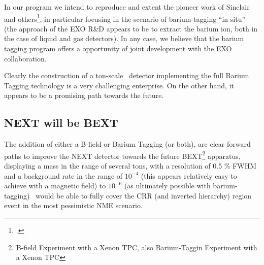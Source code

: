 In our program we intend to reproduce and extent the pioneer work of Sinclair and others\footcite{Sinclair:2011zz}, in particular focusing in the scenario of barium-tagging ``in situ'' (the approach of the EXO R\&D appears to be to extract the barium ion, both in the case of liquid and gas detectors). In any case, we believe that the barium tagging program offers a opportunity of joint development with the EXO collaboration.

Clearly the construction of a ton-scale \HPXE\ detector implementing the full Barium Tagging technology is a very challenging enterprise. On the other hand, it appears to be a promising path towards the future. 


  
\subsection{NEXT will be BEXT}
The addition of either a B-field or Barium Tagging (or both), are clear forward paths to improve the NEXT detector towards the future BEXT\footnote{B-field Experiment with a Xenon TPC, also Barium-Taggin Experiment with a Xenon TPC} apparatus, displaying  
a mass in the range of several tons, with a resolution of 0.5 \% FWHM and a background rate in the range of $10^{-4}$ (this appears relatively easy to achieve with a magnetic field) to $10^{-6}$ (as ultimately possible with barium-tagging) \ckky\ would be able to fully cover the CRR (and inverted hierarchy) region event in the most pessimistic NME scenario. 



